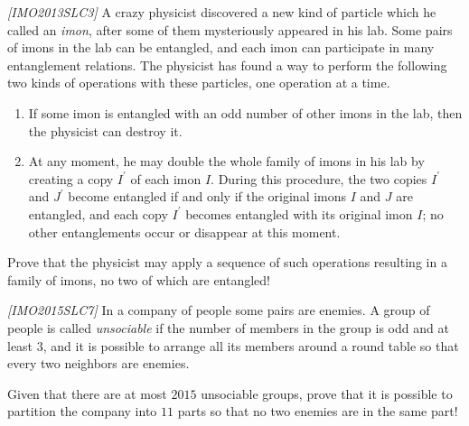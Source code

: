 \begin{problem}
\textit{[IMO2013SLC3]}
A crazy physicist discovered a new kind of particle which he called an \textit{imon}, after some of them mysteriously appeared in his lab. Some pairs of imons in the lab can be entangled, and each imon can participate in many entanglement relations. The physicist has found a way to perform the following two kinds of operations with these particles, one operation at a time.
\begin{enumerate}
\item If some imon is entangled with an odd number of other imons in the lab, then the physicist
can destroy it.
\item At any moment, he may double the whole family of imons in his lab by creating a copy $I^\prime$ of each imon $I$. During this procedure, the two copies $I^\prime$ and $J^\prime$ become entangled if and only if the original imons $I$ and $J$ are entangled, and each copy $I^\prime$ becomes entangled with its original imon $I$; no other entanglements occur or disappear at this moment.
\end{enumerate}
Prove that the physicist may apply a sequence of such operations resulting in a family of imons, no two of which are entangled!
\end{problem}
%

\begin{problem}
\textit{[IMO2015SLC7]}
In a company of people some pairs are enemies. A group of people is called \textit{unsociable} if the number of members in the group is odd and at least $3$, and it is possible to arrange all its members around a round table so that every two neighbors are enemies. 

Given that there are at most $2015$ unsociable groups, prove that it is possible to partition the company into $11$ parts so that no two enemies are in the same part!
\end{problem}
%

